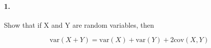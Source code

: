 


\renewcommand\assignment{Worksheet 19, Due March 8, 4:15pm}


    \iffalse
    \begin{equation*}
        \begin{gathered}
            Equations go here.
        \end{gathered}
    \end{equation*}

    \resizebox{\hsize}{!}{$Long equation goes here$}

    \begin{multicol*}{# of columns}
    \end{multicol*}

    \horizontal

    \fi


    \paragraph*{1.}
    Show that if X and Y are random variables, then

    \begin{equation*}
        \text{var}(X + Y) = \text{var}(X) + \text{var}(Y ) + 2\text{cov}(X, Y )
    \end{equation*}

